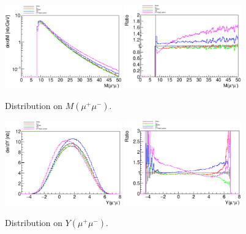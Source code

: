 \begin{figure}
\begin{center}
\includegraphics[width = 0.45\textwidth]{figures/M.eps}
\includegraphics[width = 0.45\textwidth]{figures/RatioM.eps}
\end{center}
\caption {Distribution on $M(\mu^+\mu^-)$.}
\label{fig1}
\end{figure}

\begin{figure}
\begin{center}
\includegraphics[width = 0.45\textwidth]{figures/Y.eps}
\includegraphics[width = 0.45\textwidth]{figures/RatioY.eps}
\end{center}
\caption {Distribution on $Y(\mu^+\mu^-)$.}
\label{fig2}
\end{figure}

